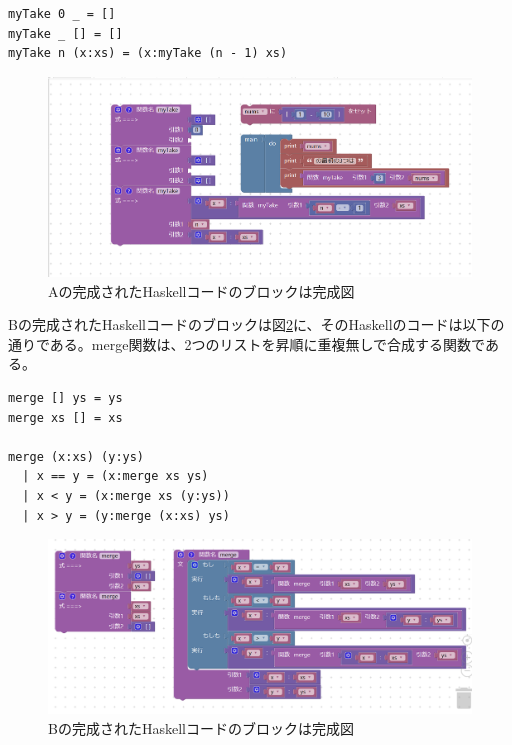 \documentclass{risepaper}
\begin{document}
\begin{itemize}
\begin{lstlisting}[basicstyle=\ttfamily\footnotesize]
myTake 0 _ = []
myTake _ [] = []
myTake n (x:xs) = (x:myTake (n - 1) xs)
\end{lstlisting}

\begin{figure}[h]
\begin{center}
\includegraphics[scale=0.5]{img/haskell_experiment_result_a.PNG}
\caption{Aの完成されたHaskellコードのブロックは完成図}%
\label{fig:haskell_experiment_result_a}
\end{center}%
\end{figure}%

Bの完成されたHaskellコードのブロックは図\ref{fig:haskell_experiment_result_b}に、そのHaskellのコードは以下の通りである。merge関数は、2つのリストを昇順に重複無しで合成する関数である。
\begin{lstlisting}[basicstyle=\ttfamily\footnotesize]
merge [] ys = ys
merge xs [] = xs

merge (x:xs) (y:ys)
  | x == y = (x:merge xs ys)
  | x < y = (x:merge xs (y:ys))
  | x > y = (y:merge (x:xs) ys)
\end{lstlisting}

\begin{figure}[h]
\begin{center}
\includegraphics[scale=0.5]{img/haskell_experiment_result_b.PNG}
\caption{Bの完成されたHaskellコードのブロックは完成図}%
\label{fig:haskell_experiment_result_b}
\end{center}%
\end{figure}%

\end{itemize} 
\end{document}
